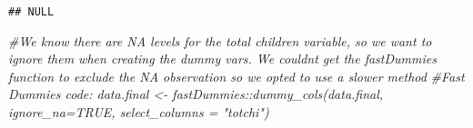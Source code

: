 \documentclass[
]{article}
\newenvironment{Shaded}{\begin{snugshade}}{\end{snugshade}}
\newcommand{\CommentTok}[1]{\textcolor[rgb]{0.56,0.35,0.01}{\textit{#1}}}
\newcommand{\FunctionTok}[1]{\textcolor[rgb]{0.00,0.00,0.00}{#1}}
\newcommand{\NormalTok}[1]{#1}
\newcommand{\SpecialCharTok}[1]{\textcolor[rgb]{0.00,0.00,0.00}{#1}}
\begin{document}
\begin{Shaded}
\end{Shaded}

\begin{verbatim}
## NULL
\end{verbatim}

\begin{Shaded}
\begin{Highlighting}[]
\CommentTok{\#We know there are NA levels for the total children variable, so we want to ignore them when creating the dummy vars. We couldn\textquotesingle{}t get the fastDummies function to exclude the NA observation so we opted to use a slower method}
\CommentTok{\#Fast Dummies code: data.final \textless{}{-} fastDummies::dummy\_cols(data.final, ignore\_na=TRUE, select\_columns = "totchi")}


\end{Highlighting}
\end{Shaded}
\end{document}
